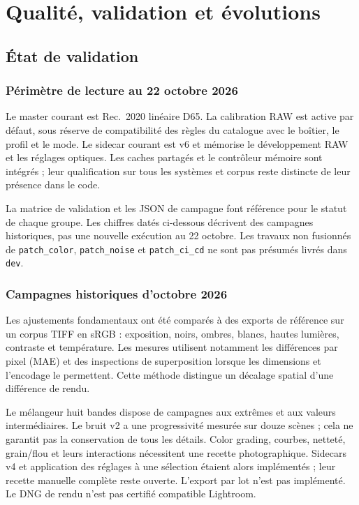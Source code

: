 \chapter{Qualité, validation et évolutions}
\label{chap:qualite}

\section{État de validation}

\subsection{Périmètre de lecture au 22 octobre 2026}

Le master courant est Rec.~2020 linéaire D65. La calibration RAW est active par défaut, sous réserve de compatibilité des règles du catalogue avec le boîtier, le profil et le mode. Le sidecar courant est v6 et mémorise le développement RAW et les réglages optiques. Les caches partagés et le contrôleur mémoire sont intégrés ; leur qualification sur tous les systèmes et corpus reste distincte de leur présence dans le code.

La matrice de validation et les JSON de campagne font référence pour le statut de chaque groupe. Les chiffres datés ci-dessous décrivent des campagnes historiques, pas une nouvelle exécution au 22 octobre. Les travaux non fusionnés de \texttt{patch\_color}, \texttt{patch\_noise} et \texttt{patch\_ci\_cd} ne sont pas présumés livrés dans \texttt{dev}.

\subsection{Campagnes historiques d'octobre 2026}

Les ajustements fondamentaux ont été comparés à des exports de référence sur un corpus TIFF en sRGB : exposition, noirs, ombres, blancs, hautes lumières, contraste et température. Les mesures utilisent notamment les différences par pixel (MAE) et des inspections de superposition lorsque les dimensions et l'encodage le permettent. Cette méthode distingue un décalage spatial d'une différence de rendu.

Le mélangeur huit bandes dispose de campagnes aux extrêmes et aux valeurs
intermédiaires. Le bruit v2 a une progressivité mesurée sur douze scènes ;
cela ne garantit pas la conservation de tous les détails. Color grading,
courbes, netteté, grain/flou et leurs interactions nécessitent une recette
photographique. Sidecars v4 et application des réglages à une sélection étaient alors
implémentés ; leur recette manuelle complète reste ouverte. L'export par lot
n'est pas implémenté. Le DNG de rendu n'est pas certifié compatible Lightroom.


